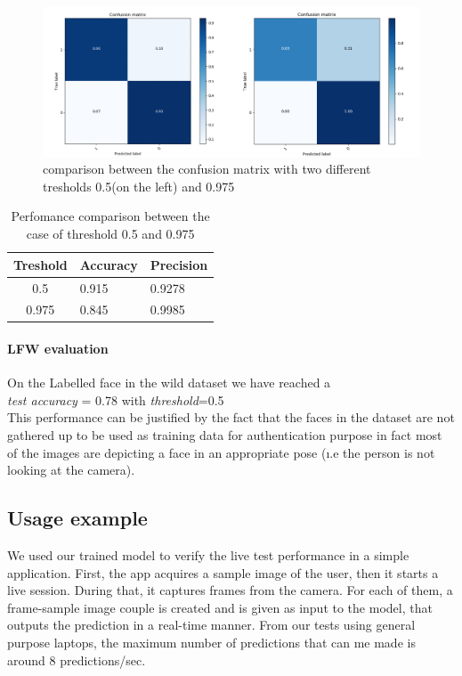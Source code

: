 \begin{figure}
\begin{center}

\includegraphics[width=1\linewidth]{images/merged.png}
\end{center}
   \caption{comparison between the confusion matrix with two different tresholds 0.5(on the left) and 0.975}
\label{fig:conf_matrices}
\end{figure}

\begin{table}[]
\centering
\begin{tabular}{|c|ll|}
\hline
Treshold & Accuracy & Precision \\ \hline
0.5                          & 0.915    & 0.9278     \\ \hline
0.975                          & 0.845    & 0.9985     \\ \hline
\end{tabular}
\caption{Perfomance comparison between the case of threshold 0.5 and 0.975}
\end{table}

\paragraph{LFW evaluation}
On the Labelled face in the wild dataset we have reached a
\\

\textit{test accuracy }= 0.78 with \textit{threshold}=0.5
\\

This performance can be justified by the fact that the faces in the dataset are not gathered up to be used as training data for authentication purpose in fact most of the images are depicting a face in an appropriate pose (\i.e the person is not looking at the camera).

\subsection{Usage example}
We used our trained model to verify the live test performance in a simple application. First, the app acquires a sample image of the user, then it starts a live session. During that, it captures frames from the camera. For each of them, a frame-sample image couple is created and is given as input to the model, that outputs the prediction in a real-time manner. From our tests using general purpose laptops, the maximum number of predictions that can me made is around 8 predictions/sec.
